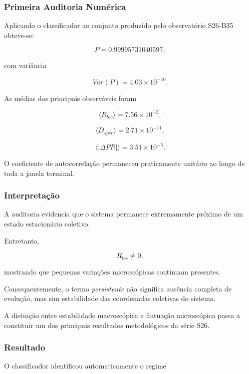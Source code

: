 \documentclass[11pt,a4paper]{article}
\begin{document}

\subsubsection{Primeira Auditoria Numérica}

Aplicando o classificador ao conjunto produzido pelo observatório
S26-B35 obteve-se:

\[
P
=
0.99995731040597,
\]

com variância

\[
Var(P)
=
4.03\times10^{-10}.
\]

As médias dos principais observáveis foram

\[
\langle R_{loc}\rangle
=
7.56\times10^{-2},
\]

\[
\langle D_{spec}\rangle
=
2.71\times10^{-11},
\]

\[
\langle |\Delta PR|\rangle
=
3.51\times10^{-5}.
\]

O coeficiente de autocorrelação permaneceu praticamente unitário ao
longo de toda a janela terminal.


\subsubsection{Interpretação}

A auditoria evidencia que o sistema permanece extremamente próximo de um
estado estacionário coletivo.

Entretanto,

\[
R_{loc}\neq0,
\]

mostrando que pequenas variações microscópicas continuam presentes.

Consequentemente, o termo
\emph{persistente}
não significa ausência completa de evolução, mas sim estabilidade das
coordenadas coletivas do sistema.

A distinção entre estabilidade macroscópica e flutuação microscópica
passa a constituir um dos principais resultados metodológicos da série
S26.


\subsubsection{Resultado}

O classificador identificou automaticamente o regime
\end{document}
